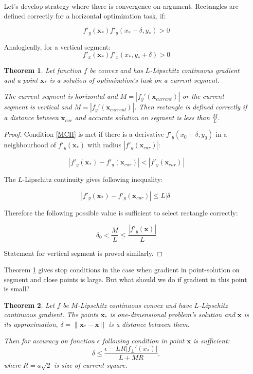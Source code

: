 \documentclass[12pt]{article}
\newtheorem{theorem}{Theorem}[section]
\begin{document}
Let's develop strategy where there is convergence on argument. Rectangles are defined correctly for a horizontal optimization task, if:

\begin{equation}\label{MCH}
f'_y(\textbf{x}_*)f'_y(x_*+\delta, y_*) > 0
\end{equation}

Analogically, for a vertical segment:
\begin{equation}\label{MCV}
f'_x(\textbf{x}_*)f'_x(x_*, y_*+\delta) > 0
\end{equation}

\begin{theorem}
\label{CurGrad}
Let function $f$ be convex and has $L$-Lipschitz continuous gradient and a point $\textbf{x}_*$ is a solution of optimization's  task on a current segment. 

The current segment is horizontal and $M = |f_y'(\textbf{x}_{current})|$ or the current segment is vertical and $M = |f_y'(\textbf{x}_{current})|$. Then rectangle is defined correctly if a distance between $\textbf{x}_{cur}$ and accurate solution on segment is less than $\frac{M}{L}$.
\end{theorem}
\begin{proof}
Condition \eqref{MCH} is met if there is a derivative $f'_y(x_0+\delta, y_0)$ in a neighbourhood of 
$f'_y(\textbf{x}_*)$ with radius $\left|f'_y(\textbf{x}_{cur})\right|$:

$$\left|f'_y(\textbf{x}_*) - f'_y(\textbf{x}_{cur})\right|<\left|f'_y(\textbf{x}_{cur})\right|$$

The $L$-Lipschitz continuity gives following inequality:

$$\left|f'_y(\textbf{x}_*) - f'_y(\textbf{x}_{cur})\right| \leq L|\delta|$$

Therefore the following possible value is sufficient to select rectangle correctly:

$$\delta_0 < \frac{M}{L} \leq \frac{\left|f'_y(\textbf{x})\right|}{L}$$

Statement for vertical segment is proved similarly.
\end{proof}

Theorem \ref{CurGrad} gives stop conditions in the case when gradient in point-solution on segment and close points is large. But what should we do if gradient in this point is small?

\begin{theorem}
\label{small}
Let $f$ be $M$-Lipschitz continuous convex and have $L$-Lipschitz continuous gradient. The points $\textbf{x}_*$ is one-dimensional problem's solution and $\textbf{x}$ is its approximation, $\delta = \|\textbf{x}_*-\textbf{x}\|$ is a distance between them.

Then for accuracy on function $\epsilon$ following condition in point $\textbf{x}$ is sufficient:
$$\delta \leq \frac{\epsilon-LR|f_\perp'(x_*)|}{L+MR}, $$
where $R=a\sqrt{2}$ is size of current square.
\end{theorem}
\end{document}
